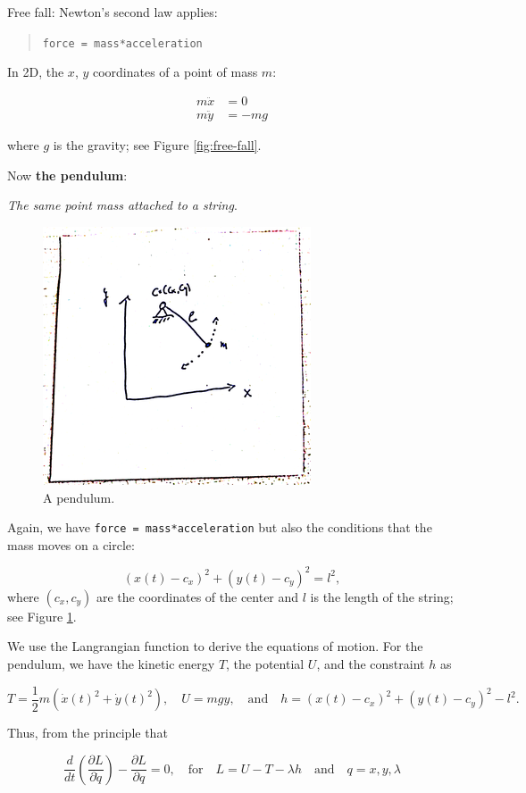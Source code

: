 \documentclass[]{book}
\theoremstyle{definition}
\theoremstyle{definition}
\theoremstyle{definition}
\theoremstyle{remark}
\begin{document}
Free fall: Newton's second law applies:

\begin{quote}
\texttt{force\ =\ mass*acceleration}
\end{quote}

In 2D, the \(x\), \(y\) coordinates of a point of mass \(m\):

\begin{align*}
m\ddot x &= 0 \\
m\ddot y &= -mg
\end{align*}

where \(g\) is the gravity; see Figure \ref{fig:free-fall}.

Now \textbf{the pendulum}:

\emph{The same point mass attached to a string}.

\begin{figure}

{\centering \includegraphics[width=0.4\linewidth]{pics/pendulum} 

}

\caption{A pendulum.}\label{fig:pendulum}
\end{figure}

Again, we have \texttt{force\ =\ mass*acceleration} but also the
conditions that the mass moves on a circle:

\[
 (x(t) - c_x)^2 + (y(t) - c_y)^2 = l^2,
\] where \((c_x, c_y)\) are the coordinates of the center and \(l\) is
the length of the string; see Figure \ref{fig:pendulum}.

We use the Langrangian function to derive the equations of motion. For
the pendulum, we have the kinetic energy \(T\), the potential \(U\), and
the constraint \(h\) as

\[
  T = \frac 12 m (\dot x(t)^2 + \dot y(t)^2), \quad U = mgy, \quad \text{and} \quad h = (x(t) - c_x)^2 + (y(t) - c_y)^2 - l^2 .
\]

Thus, from the principle that

\[
\frac{d}{dt}(\frac{\partial L}{\partial \dot q}) - \frac{\partial L}{\partial q} = 0, \quad\text{for}\quad L = U -T - \lambda h \quad\text{and}\quad q=x, y ,\lambda
\]
\end{document}
